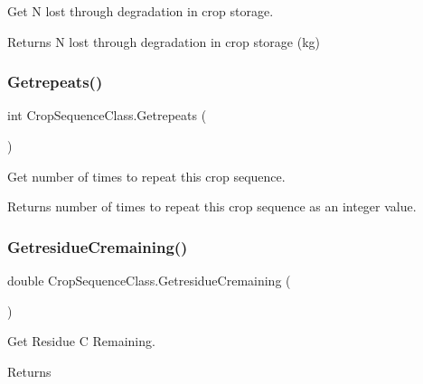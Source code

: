 Get N lost through degradation in crop storage. 

\begin{DoxyReturn}{Returns}
N lost through degradation in crop storage (kg) 
\end{DoxyReturn}
\mbox{\label{class_crop_sequence_class_a07ab6e17af1240ac95f3cbd4126eacc8}} 
\subsubsection{\texorpdfstring{Getrepeats()}{Getrepeats()}}
{\footnotesize\ttfamily int Crop\+Sequence\+Class.\+Getrepeats (\begin{DoxyParamCaption}{ }\end{DoxyParamCaption})\hspace{0.3cm}{\ttfamily [inline]}}



Get number of times to repeat this crop sequence. 

\begin{DoxyReturn}{Returns}
number of times to repeat this crop sequence as an integer value. 
\end{DoxyReturn}
\mbox{\label{class_crop_sequence_class_a387a4ec45e99e4110fc538908a6d2bb9}} 
\subsubsection{\texorpdfstring{GetresidueCremaining()}{GetresidueCremaining()}}
{\footnotesize\ttfamily double Crop\+Sequence\+Class.\+Getresidue\+Cremaining (\begin{DoxyParamCaption}{ }\end{DoxyParamCaption})\hspace{0.3cm}{\ttfamily [inline]}}



Get Residue C Remaining. 

\begin{DoxyReturn}{Returns}

\end{DoxyReturn}
\mbox{\label{class_crop_sequence_class_a68765f1adc5627b9c44f53c38d3620d3}} 
